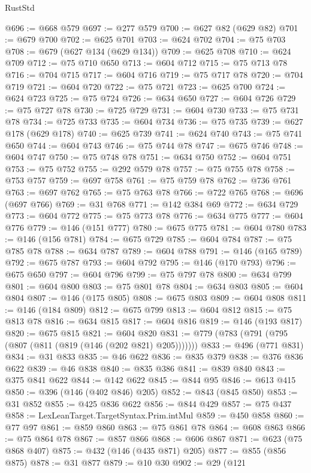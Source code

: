 \begin{lexlean}{RustStd}
\begin{coremodule}
@696 := @668 @579
@697 := @277 @579
@700 := @627 @82 (@629 @82)
@701 := @679 @700
@702 := @625 @701
@703 := @624 @702
@704 := @75 @703
@708 := @679 (@627 @134 (@629 @134))
@709 := @625 @708
@710 := @624 @709
@712 := @75 @710 @650
@713 := @604 @712
@715 := @75 @713 @78
@716 := @704 @715
@717 := @604 @716
@719 := @75 @717 @78
@720 := @704 @719
@721 := @604 @720
@722 := @75 @721
@723 := @625 @700
@724 := @624 @723
@725 := @75 @724
@726 := @634 @650
@727 := @604 @726
@729 := @75 @727 @78
@730 := @725 @729
@731 := @604 @730
@733 := @75 @731 @78
@734 := @725 @733
@735 := @604 @734
@736 := @75 @735
@739 := @627 @178 (@629 @178)
@740 := @625 @739
@741 := @624 @740
@743 := @75 @741 @650
@744 := @604 @743
@746 := @75 @744 @78
@747 := @675 @746
@748 := @604 @747
@750 := @75 @748 @78
@751 := @634 @750
@752 := @604 @751
@753 := @75 @752
@755 := @292 @579 @78
@757 := @75 @755 @78
@758 := @753 @757
@759 := @697 @758
@761 := @75 @759 @78
@762 := @736 @761
@763 := @697 @762
@765 := @75 @763 @78
@766 := @722 @765
@768 := @696 (@697 @766)
@769 := @31 @768
@771 := @142 @384 @69
@772 := @634 @729
@773 := @604 @772
@775 := @75 @773 @78
@776 := @634 @775
@777 := @604 @776
@779 := @146 (@151 @777)
@780 := @675 @775
@781 := @604 @780
@783 := @146 (@156 @781)
@784 := @675 @729
@785 := @604 @784
@787 := @75 @785 @78
@788 := @634 @787
@789 := @604 @788
@791 := @146 (@165 @789)
@792 := @675 @787
@793 := @604 @792
@795 := @146 (@170 @793)
@796 := @675 @650
@797 := @604 @796
@799 := @75 @797 @78
@800 := @634 @799
@801 := @604 @800
@803 := @75 @801 @78
@804 := @634 @803
@805 := @604 @804
@807 := @146 (@175 @805)
@808 := @675 @803
@809 := @604 @808
@811 := @146 (@184 @809)
@812 := @675 @799
@813 := @604 @812
@815 := @75 @813 @78
@816 := @634 @815
@817 := @604 @816
@819 := @146 (@193 @817)
@820 := @675 @815
@821 := @604 @820
@831 := @779 (@783 (@791 (@795 (@807 (@811 (@819 (@146 (@202 @821) @205)))))))
@833 := @496 (@771 @831)
@834 := @31 @833
@835 := @46 @622
@836 := @835 @379
@838 := @376 @836 @622
@839 := @46 @838
@840 := @835 @386
@841 := @839 @840
@843 := @375 @841 @622
@844 := @142 @622
@845 := @844 @95
@846 := @613 @415
@850 := @396 (@146 (@402 @846) @205)
@852 := @843 (@845 @850)
@853 := @31 @852
@855 := @425 @836 @622
@856 := @844 @429
@857 := @75 @437
@858 := LexLeanTarget.TargetSyntax.Prim.intMul
@859 := @450 @858
@860 := @77 @97
@861 := @859 @860
@863 := @75 @861 @78
@864 := @608 @863
@866 := @75 @864 @78
@867 := @857 @866
@868 := @606 @867
@871 := @623 (@75 @868 @407)
@875 := @432 (@146 (@435 @871) @205)
@877 := @855 (@856 @875)
@878 := @31 @877
@879 := @10 @30
@902 := @29
    (@121

\end{coremodule}
\end{lexlean}
